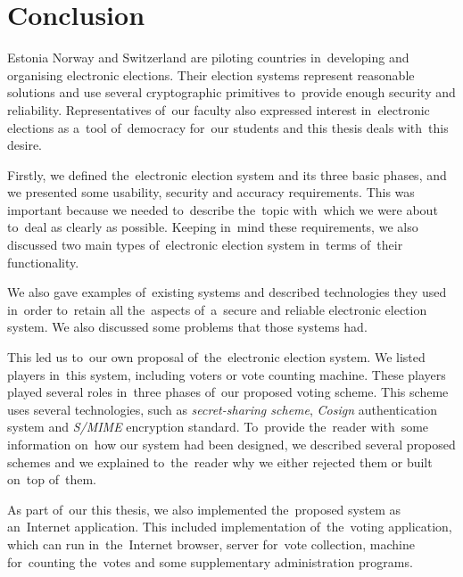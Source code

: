 \chapter*{Conclusion}
Estonia Norway and Switzerland are piloting countries in~developing and organising electronic elections. Their election systems represent reasonable solutions and use several cryptographic primitives to~provide enough security and reliability. Representatives of~our faculty also expressed interest in~electronic elections as a~tool of~democracy for~our students and this thesis deals with~this desire.

Firstly, we defined the~electronic election system and its three basic phases, and we presented some usability, security and accuracy requirements. This was important because we needed to~describe the~topic with~which we were about to~deal as clearly as possible. Keeping in~mind these requirements, we also discussed two main types of~electronic election system in~terms of~their functionality.

We also gave examples of~existing systems and described technologies they used in~order to~retain all the~aspects of~a~secure and reliable electronic election system. We also discussed some problems that those systems had. 

This led us to~our own proposal of~the~electronic election system. We listed players in~this system, including voters or vote counting machine. These players played several roles in~three phases of~our proposed voting scheme. This scheme uses several technologies, such as \emph{secret-sharing scheme}, \emph{Cosign} authentication system and \emph{S/MIME} encryption standard. To~provide the~reader with~some information on~how our system had been designed, we described several proposed schemes and we explained to~the~reader why we either rejected them or built on~top of~them.

As part of~our this thesis, we also implemented the~proposed system as an~Internet application. This included implementation of~the~voting application, which can run in~the~Internet browser, server for~vote collection, machine for~counting the~votes and some supplementary administration programs. 

